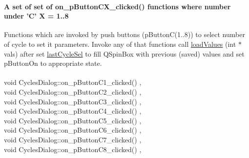 \paragraph{A set of {set of on\_pButtonCX\_clicked}() functions where number under 'C' X = 1..8 }
Functions which are invoked by push buttons (pButtonC(1..8)) to select number of cycle to set it parameters. Invoke any of that functions call \mbox{\hyperlink{classCyclesDialog_ad25bef71c8a2219252c1458fa333a376}{load\+Values}} (int $\ast$vals) after set \mbox{\hyperlink{classCyclesDialog_a1b608c6d6ebf52a902645ee910f91ffa}{last\+Cycle\+Sel}} to fill QSpinBox with previous (saved) values and set pButtonOn to appropriate state. \\
\\
{\footnotesize\ttfamily void Cycles\+Dialog\+::{\texorpdfstring{on\+\_\+p\+Button\+C1\+\_\+clicked}{}()} {\ttfamily [private]}, {\ttfamily [slot]}}\\
{\footnotesize\ttfamily void Cycles\+Dialog\+::{\texorpdfstring{on\+\_\+p\+Button\+C2\+\_\+clicked}{}()} {\ttfamily [private]}, {\ttfamily [slot]}}\\
{\footnotesize\ttfamily void Cycles\+Dialog\+::{\texorpdfstring{on\+\_\+p\+Button\+C3\+\_\+clicked}{}()} {\ttfamily [private]}, {\ttfamily [slot]}}\\
{\footnotesize\ttfamily void Cycles\+Dialog\+::{\texorpdfstring{on\+\_\+p\+Button\+C4\+\_\+clicked}{}()} {\ttfamily [private]}, {\ttfamily [slot]}}\\
{\footnotesize\ttfamily void Cycles\+Dialog\+::{\texorpdfstring{on\+\_\+p\+Button\+C5\+\_\+clicked}{}()} {\ttfamily [private]}, {\ttfamily [slot]}}\\
{\footnotesize\ttfamily void Cycles\+Dialog\+::{\texorpdfstring{on\+\_\+p\+Button\+C6\+\_\+clicked}{}()} {\ttfamily [private]}, {\ttfamily [slot]}}\\
{\footnotesize\ttfamily void Cycles\+Dialog\+::{\texorpdfstring{on\+\_\+p\+Button\+C7\+\_\+clicked}{}()} {\ttfamily [private]}, {\ttfamily [slot]}}\\
{\footnotesize\ttfamily void Cycles\+Dialog\+::{\texorpdfstring{on\+\_\+p\+Button\+C8\+\_\+clicked}{}()} {\ttfamily [private]}, {\ttfamily [slot]}}
\mbox{\label{classCyclesDialog_a2f918e498a7c5cd77b12edb6923fb78d}} 
\mbox{\label{classCyclesDialog_a1e4ad2ee11ec162987d24e2071c3f5c4}} 
